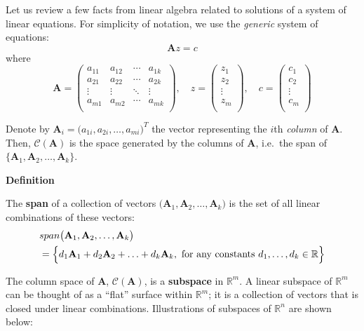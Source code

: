 \documentclass[
]{book}
\begin{document}
Let us review a few facts from linear algebra related to solutions of a system of linear equations. For simplicity of notation, we use the \emph{generic} system of equations:
\[\mathbf{A} z = c\]
where
\[ \mathbf{A}=\left(\begin{array}{cccc}
    a_{11} & a_{12} & \cdots & a_{1k} \\
    a_{21} & a_{22} & \cdots & a_{2k}   \\
      \vdots & \vdots & \ddots & \vdots\\
  a_{m1} & a_{m2} & \cdots & a_{mk}  \\
    \end{array} \right),\quad
    z =\left(\begin{array}{c}
    z_{1} \\
    z_{2}   \\
   \vdots\\
    z_{m}  \\
    \end{array} \right),\quad
    c =\left(\begin{array}{c}
    c_{1} \\
    c_{2}   \\
   \vdots\\
    c_{m}  \\
    \end{array} \right)
    \]

Denote by \(\mathbf{A}_{i} = \bigl( a_{1i}, a_{2i}, \ldots, a_{mi}\bigr)^T\) the vector representing the \(i\)th \emph{column} of \(\mathbf{A}\). Then, \(\mathcal{C}(\mathbf{A})\) is the space generated by the columns of \(\mathbf{A}\), i.e.~the span of \(\bigl\{\mathbf{A}_1, \mathbf{A}_2, \ldots, \mathbf{A}_{k}\bigr\}\).

\textbf{Definition}

The \textbf{span} of a collection of vectors \(\bigl(\mathbf{A}_1, \mathbf{A}_2, \ldots, \mathbf{A}_{k}\bigr)\) is the set of all linear combinations of these vectors:
\begin{align*}
&span \bigl(\mathbf{A}_1, \mathbf{A}_2, \ldots, \mathbf{A}_{k}\bigr) \\
&= \Bigl\{ d_1 \mathbf{A}_1 + d_2 \mathbf{A}_2 + \ldots + d_k \mathbf{A}_{k}, \text{ for any constants } d_1, \ldots, d_k \in \mathbb{R}
\Bigr\}
\end{align*}

The column space of \(\mathbf{A}\), \(\mathcal{C}(\mathbf{A})\), is a \textbf{subspace} in \(\mathbb{R}^m\). A linear subspace of \(\mathbb{R}^m\) can be thought of as a ``flat'' surface within \(\mathbb{R}^m\); it is a collection of vectors that is closed under linear combinations. Illustrations of subspaces of \(\mathbb{R}^n\) are shown below:
\end{document}

